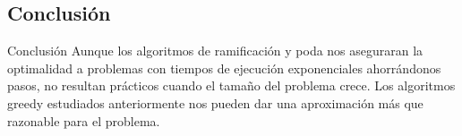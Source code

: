 \subsection{Conclusión}
\begin{frame}
	\begin{alertblock}{Conclusión}
	Aunque los algoritmos de ramificación y poda nos aseguraran la optimalidad a problemas con
	tiempos de ejecución exponenciales ahorrándonos pasos, no resultan prácticos cuando el tamaño
	del problema crece. Los algoritmos greedy estudiados anteriormente nos pueden dar una 
	aproximación más que razonable para el problema.
	\end{alertblock}
\end{frame}
